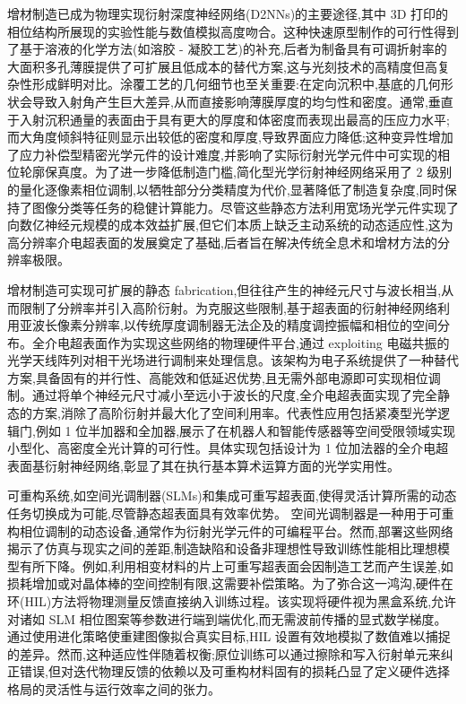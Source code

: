 增材制造已成为物理实现衍射深度神经网络(D2NNs)的主要途径,其中 3D 打印的相位结构所展现的实验性能与数值模拟高度吻合。这种快速原型制作的可行性得到了基于溶液的化学方法(如溶胶 - 凝胶工艺)的补充,后者为制备具有可调折射率的大面积多孔薄膜提供了可扩展且低成本的替代方案,这与光刻技术的高精度但高复杂性形成鲜明对比。涂覆工艺的几何细节也至关重要:在定向沉积中,基底的几何形状会导致入射角产生巨大差异,从而直接影响薄膜厚度的均匀性和密度。通常,垂直于入射沉积通量的表面由于具有更大的厚度和体密度而表现出最高的压应力水平;而大角度倾斜特征则显示出较低的密度和厚度,导致界面应力降低;这种变异性增加了应力补偿型精密光学元件的设计难度,并影响了实际衍射光学元件中可实现的相位轮廓保真度。为了进一步降低制造门槛,简化型光学衍射神经网络采用了 2 级别的量化逐像素相位调制,以牺牲部分分类精度为代价,显著降低了制造复杂度,同时保持了图像分类等任务的稳健计算能力。尽管这些静态方法利用宽场光学元件实现了向数亿神经元规模的成本效益扩展,但它们本质上缺乏主动系统的动态适应性,这为高分辨率介电超表面的发展奠定了基础,后者旨在解决传统全息术和增材方法的分辨率极限。\citep{doi_10_1126_science_aat8084_e055772d} \citep{doi_10_1038_s41598_025_33607_1_2162f081} \citep{doi_10_1002_lpor_202402303_1f555bd4} \citep{doi_10_1116_1_5011790_9ce3fdef}

增材制造可实现可扩展的静态 fabrication,但往往产生的神经元尺寸与波长相当,从而限制了分辨率并引入高阶衍射。为克服这些限制,基于超表面的衍射神经网络利用亚波长像素分辨率,以传统厚度调制器无法企及的精度调控振幅和相位的空间分布。全介电超表面作为实现这些网络的物理硬件平台,通过 exploiting 电磁共振的光学天线阵列对相干光场进行调制来处理信息。该架构为电子系统提供了一种替代方案,具备固有的并行性、高能效和低延迟优势,且无需外部电源即可实现相位调制。通过将单个神经元尺寸减小至远小于波长的尺度,全介电超表面实现了完全静态的方案,消除了高阶衍射并最大化了空间利用率。代表性应用包括紧凑型光学逻辑门,例如 1 位半加器和全加器,展示了在机器人和智能传感器等空间受限领域实现小型化、高密度全光计算的可行性。具体实现包括设计为 1 位加法器的全介电超表面基衍射神经网络,彰显了其在执行基本算术运算方面的光学实用性。\citep{doi_10_1515_nanoph_2023_0760_2c3ec088} \citep{doi_10_3390_nano14221812_4d7d91b1} \citep{doi_10_1515_nanoph_2023_0760_2c3ec088} \citep{doi_10_1117_12_2688132_926a2697}

可重构系统,如空间光调制器(SLMs)和集成可重写超表面,使得灵活计算所需的动态任务切换成为可能,尽管静态超表面具有效率优势。\citep{doi_10_1002_adom_202300561_c4d7a5b0} \citep{doi_10_32446_0368_1025it_2023_12_35_39_fb1bb2c3} 空间光调制器是一种用于可重构相位调制的动态设备,通常作为衍射光学元件的可编程平台。然而,部署这些网络揭示了仿真与现实之间的差距,制造缺陷和设备非理想性导致训练性能相比理想模型有所下降。例如,利用相变材料的片上可重写超表面会因制造工艺而产生误差,如损耗增加或对晶体棒的空间控制有限,这需要补偿策略。为了弥合这一鸿沟,硬件在环(HIL)方法将物理测量反馈直接纳入训练过程。该实现将硬件视为黑盒系统,允许对诸如 SLM 相位图案等参数进行端到端优化,而无需波前传播的显式数学梯度。通过使用进化策略使重建图像拟合真实目标,HIL 设置有效地模拟了数值难以捕捉的差异。然而,这种适应性伴随着权衡;原位训练可以通过擦除和写入衍射单元来纠正错误,但对迭代物理反馈的依赖以及可重构材料固有的损耗凸显了定义硬件选择格局的灵活性与运行效率之间的张力。\citep{doi_10_1038_s41598_025_19638_8_1b2db1c9} \citep{doi_10_1364_oe_461549_b2d41b3f}


